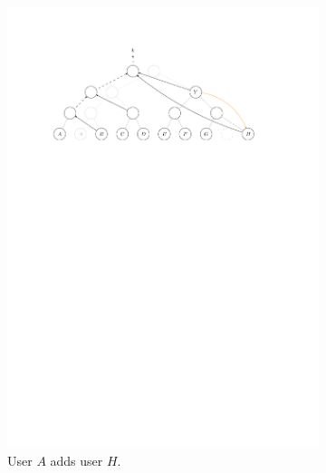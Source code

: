 \begin{figure}
	\centering
	\begin{subfigure}[b]{\textwidth}
		\centering
		\includegraphics[width=\textwidth]{./figures/treekem-add-1}
		\caption{User $A$ adds user $H$.}
		\label{fig:treekem-A-add-H}
	\end{subfigure}
	\begin{subfigure}[b]{\textwidth}
		\centering

\end{subfigure}
\end{figure}
